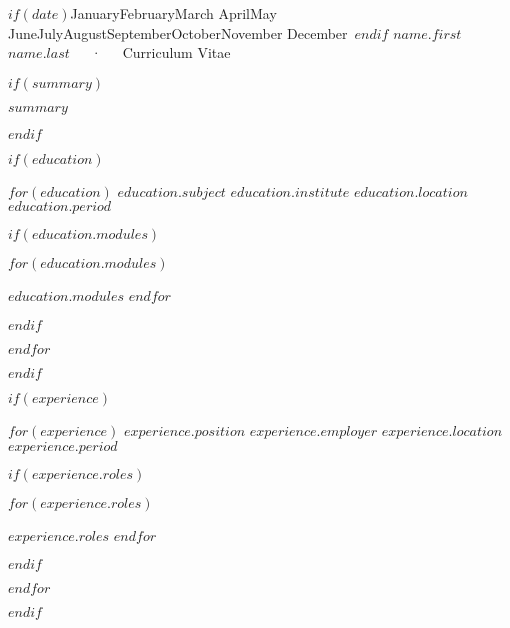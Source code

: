 \documentclass[12pt, letterpaper]{awesome-cv}
\renewcommand{\today}{\ifcase \month \or January\or February\or March\or %
April\or May \or June\or July\or August\or September\or October\or November\or %
December\fi\  \number \year}
\begin{document}
\makecvheader

\makecvfooter
  {$if(date)$\today$endif$}
  {$name.first$ $name.last$~~~·~~~Curriculum Vitae}
  {\thepage}



$if(summary)$
  \begin{cvparagraph}

    $summary$
  \end{cvparagraph}
$endif$

$if(education)$
  \begin{cventries}

    $for(education)$
      \cventry
      {$education.subject$}
      {$education.institute$}
      {$education.location$}
      {$education.period$}
      {
        $if(education.modules)$
          \begin{cvitems}
            $for(education.modules)$
              \item {$education.modules$}
            $endfor$
          \end{cvitems}
        $endif$
      }

    $endfor$
  \end{cventries}
$endif$

$if(experience)$
  \begin{cventries}

    $for(experience)$
      \cventry
      {$experience.position$}
      {$experience.employer$}
      {$experience.location$}
      {$experience.period$}
      {
        $if(experience.roles)$
          \begin{cvitems}
            $for(experience.roles)$
              \item {$experience.roles$}
            $endfor$
          \end{cvitems}
        $endif$
      }

    $endfor$
  \end{cventries}
$endif$
\end{document}
